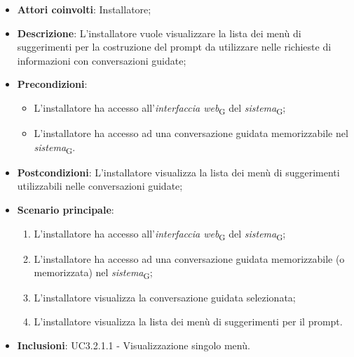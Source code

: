 \begin{itemize}
    \item \textbf{Attori coinvolti}: Installatore;
    \item \textbf{Descrizione}: L'installatore vuole visualizzare la lista dei menù di suggerimenti per la costruzione del prompt da utilizzare nelle richieste di informazioni con conversazioni guidate;
    \item \textbf{Precondizioni}: 
    \begin{itemize}
        \item L’installatore ha accesso all’\textit{interfaccia web}\textsubscript{G} del \textit{sistema}\textsubscript{G};
        \item L’installatore ha accesso ad una conversazione guidata memorizzabile nel \textit{sistema}\textsubscript{G}.
    \end{itemize}
    \item \textbf{Postcondizioni}: L'installatore visualizza la lista dei menù di suggerimenti utilizzabili nelle conversazioni guidate;
    \item \textbf{Scenario principale}:
    \begin{enumerate}
        \item L’installatore ha accesso all’\textit{interfaccia web}\textsubscript{G} del \textit{sistema}\textsubscript{G};
        \item L’installatore ha accesso ad una conversazione guidata memorizzabile (o memorizzata) nel \textit{sistema}\textsubscript{G};
        \item L'installatore visualizza la conversazione guidata selezionata;
        \item L'installatore visualizza la lista dei menù di suggerimenti per il prompt.
    \end{enumerate}
    \item \textbf{Inclusioni}: UC3.2.1.1 - Visualizzazione singolo menù.
\end{itemize}

